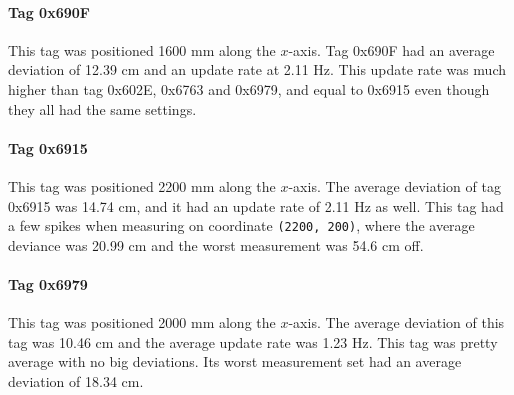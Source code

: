 \paragraph{Tag 0x690F}
This tag was positioned 1600 mm along the $x$-axis.
Tag 0x690F had an average deviation of 12.39 cm and an update rate at 2.11 Hz.
This update rate was much higher than tag 0x602E, 0x6763 and 0x6979, and equal to 0x6915 even though they all had the same settings.

\paragraph{Tag 0x6915}
This tag was positioned 2200 mm along the $x$-axis.
The average deviation of tag 0x6915 was 14.74 cm, and it had an update rate of 2.11 Hz as well.
This tag had a few spikes when measuring on coordinate \texttt{(2200, 200)}, where the average deviance was 20.99 cm and the worst measurement was 54.6 cm off.

\paragraph{Tag 0x6979}
This tag was positioned 2000 mm along the $x$-axis.
The average deviation of this tag was 10.46 cm and the average update rate was 1.23 Hz.
This tag was pretty average with no big deviations.
Its worst measurement set had an average deviation of 18.34 cm.


